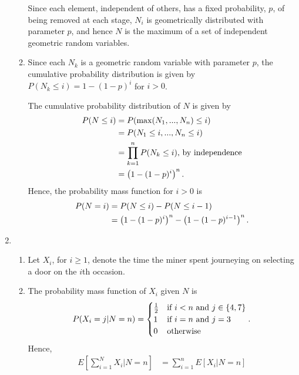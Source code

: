 \documentclass{article}
\begin{document}
\begin{enumerate}
\begin{enumerate}
        Since each element, independent of others, has a fixed probability, $p$, of being removed at each stage, $N_i$ is geometrically distributed
        with parameter $p$, and hence $N$ is the maximum of a set of independent geometric random variables.
    \item
        Since each $N_k$ is a geometric random variable with parameter $p$, the cumulative probability distribution is given by $P(N_k \leq i) = 1-(1-p)^i$ for $i>0$.

        The cumulative probability distribution of $N$ is given by
        \[\begin{split}
        P( N \leq i )   & = P( \max( N_1, ..., N_n ) \leq i ) \\
                        & = P( N_1 \leq i, ..., N_n \leq i ) \\
                        & = \prod_{k=1}^n P(N_k \leq i )\text{, by independence} \\
                        & = \left(1-(1-p)^i\right)^n\text. \\
        \end{split}\]
        Hence, the probability mass function for $i>0$ is
        \[\begin{split}
        P(N=i)  & = P(N\leq i) - P(N\leq i-1) \\
                & = \left(1-(1-p)^i\right)^n - \left(1-(1-p)^{i-1}\right)^n\text. \\
        \end{split}\]
    \end{enumerate}
\item
    \begin{enumerate}
    \item
        Let $X_i$, for $i \geq 1$, denote the time the miner spent journeying on selecting a door on the $i$th occasion.
    \item
        The probability mass function of $X_i$ given $N$ is
        \[
        P(X_i=j|N=n) = 
        \begin{cases}
            \frac{1}{2}                 & \text{if } i < n \text{ and } j\in\{4,7\} \\
            1                           & \text{if } i = n \text{ and } j = 3 \\
            0                           & \text{otherwise}
        \end{cases}\text.
        \]
        Hence,
        \[\begin{split}
        E\left[\sum_{i=1}^NX_i\Bigg|N=n\right]  & = \sum_{i=1}^n E[X_i|N=n] \\

\end{split}\]
\end{enumerate}
\end{enumerate}
\end{document}
